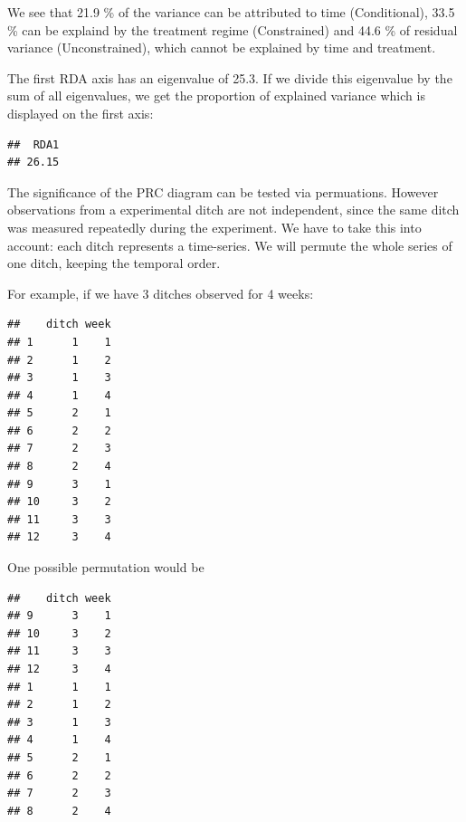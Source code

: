 \documentclass{tufte-book}\usepackage{knitr}
\begin{document}
We see that 
21.9
\% of the variance can be attributed to time (Conditional),
33.5
\% can be explaind by the treatment regime (Constrained) and 
44.6
\% of residual variance (Unconstrained), which cannot be explained by time and 
treatment.

The first RDA axis has an eigenvalue of 
25.3. If we divide this eigenvalue by the sum
of all eigenvalues, we get the proportion of explained variance which is displayed
on the first axis:

\begin{knitrout}
\color{fgcolor}\begin{kframe}
\begin{alltt}
\hlopt{$}\hlopt{$}\hlstd{eig[}\hlstd{]}\hlopt{/}\hlopt{$}\hlopt{$} \hlopt{*} 
\end{alltt}
\begin{verbatim}
##  RDA1 
## 26.15
\end{verbatim}
\end{kframe}
\end{knitrout}


The significance of the PRC diagram can be tested via permuations.
However observations from a experimental ditch are not independent, since the same ditch was measured repeatedly during the experiment. 
We have to take this into account: each ditch represents a time-series.
We will permute the whole series of one ditch, keeping the temporal order.

For example, if we have 3 ditches observed for 4 weeks:
\begin{knitrout}
\color{fgcolor}\begin{kframe}
\begin{verbatim}
##    ditch week
## 1      1    1
## 2      1    2
## 3      1    3
## 4      1    4
## 5      2    1
## 6      2    2
## 7      2    3
## 8      2    4
## 9      3    1
## 10     3    2
## 11     3    3
## 12     3    4
\end{verbatim}
\end{kframe}
\end{knitrout}


One possible permutation would be
\begin{knitrout}
\color{fgcolor}\begin{kframe}
\begin{verbatim}
##    ditch week
## 9      3    1
## 10     3    2
## 11     3    3
## 12     3    4
## 1      1    1
## 2      1    2
## 3      1    3
## 4      1    4
## 5      2    1
## 6      2    2
## 7      2    3
## 8      2    4
\end{verbatim}
\end{kframe}
\end{knitrout}
\end{document}
